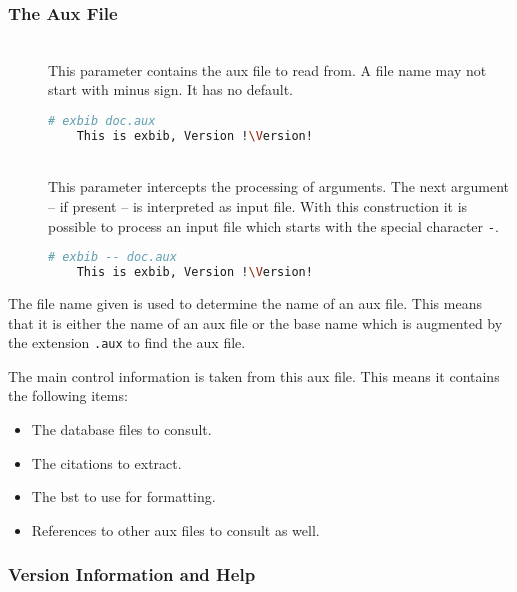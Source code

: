 \subsubsection{The Aux File}

\begin{description}
\item[]\ \\
  This parameter contains the aux file to read from. A file name may not
  start with minus sign. It has no default.
  \begin{lstlisting}[language=sh,escapechar=!]
    # exbib doc.aux
    This is exbib, Version !\Version!
  \end{lstlisting}
  
\item[\CLi{} ]
\item[\CLI{} ]\ \\
  This parameter intercepts the processing of arguments. The next
  argument -- if present -- is interpreted as input file. With this
  construction it is possible to process an input file which starts
  with the special character \verb|-|.
  \begin{lstlisting}[language=sh,escapechar=!]
    # exbib -- doc.aux
    This is exbib, Version !\Version!
  \end{lstlisting}

\end{description}

The file name given is used to determine the name of an aux file. This
means that it is either the name of an aux file or the base name which
is augmented by the extension \texttt{.aux} to find the aux file.

The main control information is taken from this aux file. This means
it contains the following items:

\begin{itemize}
\item The database files to consult.
\item The citations to extract.
\item The bst to use for formatting.
\item References to other aux files to consult as well.
\end{itemize}

\subsubsection{Version Information and Help}

